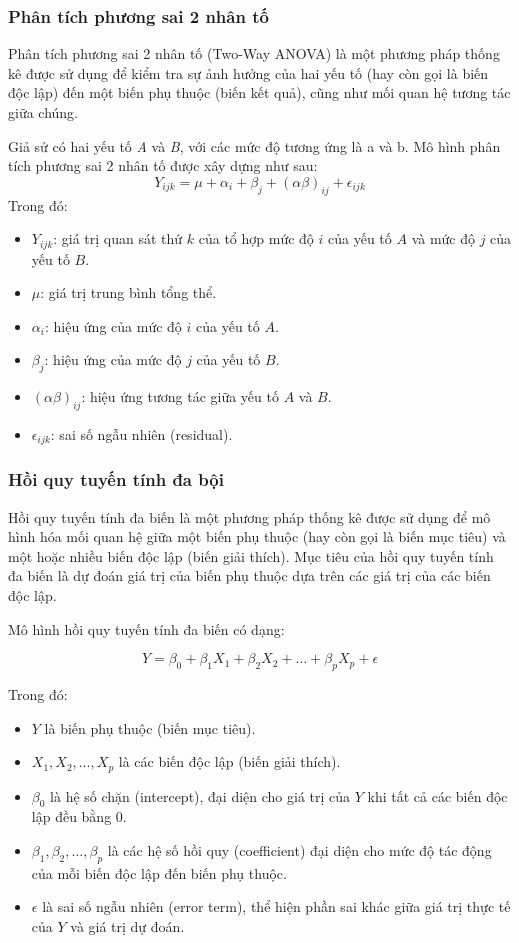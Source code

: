 \subsubsection{Phân tích phương sai 2 nhân tố}
Phân tích phương sai 2 nhân tố (Two-Way ANOVA) là một phương pháp thống kê được sử dụng để kiểm tra sự ảnh hưởng của hai yếu tố (hay còn gọi là biến độc lập) đến một biến phụ thuộc (biến kết quả), cũng như mối quan hệ tương tác giữa chúng.

Giả sử có hai yếu tố \textit{A} và \textit{B}, với các mức độ tương ứng là a và b. Mô hình phân tích phương sai 2 nhân tố được xây dựng như sau:
\[
Y_{ijk} = \mu + \alpha_i + \beta_j + (\alpha \beta)_{ij} + \epsilon_{ijk}
\]
Trong đó:
\begin{itemize}
  \item \( Y_{ijk} \): giá trị quan sát thứ \( k \) của tổ hợp mức độ \( i \) của yếu tố \( A \) và mức độ \( j \) của yếu tố \( B \).
  \item \( \mu \): giá trị trung bình tổng thể.
  \item \( \alpha_i \): hiệu ứng của mức độ \( i \) của yếu tố \( A \).
  \item \( \beta_j \): hiệu ứng của mức độ \( j \) của yếu tố \( B \).
  \item \( (\alpha\beta)_{ij} \): hiệu ứng tương tác giữa yếu tố \( A \) và \( B \).
  \item \( \epsilon_{ijk} \): sai số ngẫu nhiên (residual).
\end{itemize}
\subsubsection{Hồi quy tuyến tính đa bội}
Hồi quy tuyến tính đa biến là một phương pháp thống kê được sử dụng để mô hình hóa mối quan hệ giữa một biến phụ thuộc (hay còn gọi là biến mục tiêu) và một hoặc nhiều biến độc lập (biến giải thích). Mục tiêu của hồi quy tuyến tính đa biến là dự đoán giá trị của biến phụ thuộc dựa trên các giá trị của các biến độc lập.

Mô hình hồi quy tuyến tính đa biến có dạng:

\[
Y = \beta_0 + \beta_1 X_1 + \beta_2 X_2 + \dots + \beta_p X_p + \epsilon
\]

Trong đó:
\begin{itemize}
  \item \(Y\) là biến phụ thuộc (biến mục tiêu).
  \item \(X_1, X_2, \dots, X_p\) là các biến độc lập (biến giải thích).
  \item \(\beta_0\) là hệ số chặn (intercept), đại diện cho giá trị của \(Y\) khi tất cả các biến độc lập đều bằng 0.
  \item \(\beta_1, \beta_2, \dots, \beta_p\) là các hệ số hồi quy (coefficient) đại diện cho mức độ tác động của mỗi biến độc lập đến biến phụ thuộc.
  \item \(\epsilon\) là sai số ngẫu nhiên (error term), thể hiện phần sai khác giữa giá trị thực tế của \(Y\) và giá trị dự đoán.
\end{itemize}

